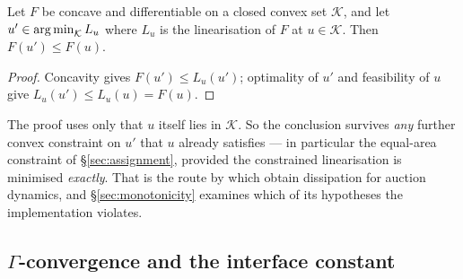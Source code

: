 \documentclass[11pt,a4paper]{article}
\begin{document}
\begin{prop}
\label{prop:dissipation}
Let $F$ be concave and differentiable on a closed convex set $\mathcal K$, and
let $u' \in \operatorname*{arg\,min}_{\mathcal K} L_u$ where $L_u$ is the linearisation of $F$ at
$u \in \mathcal K$. Then $F(u') \le F(u)$.
\end{prop}
\begin{proof}
Concavity gives $F(u') \le L_u(u')$; optimality of $u'$ and feasibility of $u$
give $L_u(u') \le L_u(u) = F(u)$.
\end{proof}

The proof uses only that $u$ itself lies in $\mathcal K$. So the conclusion
survives \emph{any} further convex constraint on $u'$ that $u$ already satisfies
--- in particular the equal-area constraint of \S\ref{sec:assignment}, provided
the constrained linearisation is minimised \emph{exactly}. That is the route by
which \cite{jacobs2018auction} obtain dissipation for auction dynamics, and
\S\ref{sec:monotonicity} examines which of its hypotheses the implementation
violates.

\subsection{\texorpdfstring{$\Gamma$}{Gamma}-convergence and the interface constant}
\label{sec:gamma}
\end{document}
